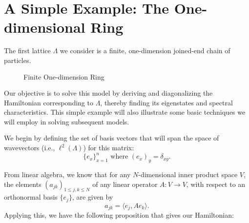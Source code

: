 \documentclass{article}
\numberwithin{equation}{section}
\numberwithin{theorem}{section}
\numberwithin{proposition}{section}
\numberwithin{lemma}{section}
\numberwithin{corollary}{section}
\numberwithin{definition}{section}
\begin{document}
\section{A Simple Example: The One-dimensional Ring}

The first lattice $\Lambda$ we consider is a finite, one-dimension joined-end chain of particles.


	\begin{figure}[h]
		\centering
		\caption{Finite One-dimension Ring}
		\label{finite1dring}
	\end{figure}
	
Our objective is to solve this model by deriving and diagonalizing the Hamiltonian corresponding to $\Lambda$, thereby finding its eigenstates and spectral characteristics. This simple example will also illustrate some basic techniques we will employ in solving subsequent models.

We begin by defining the set of basis vectors that will span the space of wavevectors (i.e., $\ell^2(\Lambda)$) for this matrix:
	\begin{equation}
	\{e_x\}_{x=1}^{n} \text{ where } (e_x)_y = \delta_{xy}.
	\end{equation}

From linear algebra, we know that for any $N$-dimensional inner product space $V$, the elements $(a_{jk})_{1 \leq j,k \leq N}$ of any linear operator $A: V \rightarrow V$, with respect to an orthonormal basis $\{e_j\}$, are given by
	\[
	a_{jk} = \langle e_j, Ae_k \rangle.
	\]
Applying this, we have the following proposition that gives our Hamiltonian:
\end{document}
